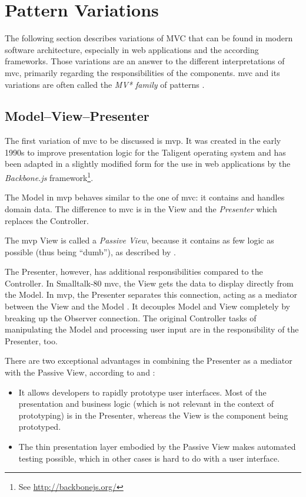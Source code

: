 \section{Pattern Variations}
The following section describes variations of MVC that can be found in modern software architecture, especially in web applications and the according frameworks. Those variations are an answer to the different interpretations of \acl{mvc}, primarily regarding the responsibilities of the components. \gls{mvc} and its variations are often called the \emph{MV* family} of patterns \cite{osmani}.

\subsection{Model--View--Presenter}
The first variation of \ac{mvc} to be discussed is \ac{mvp}. It was created in the early 1990s to improve presentation logic for the \gls{Taligent} operating system and has been adapted in a slightly modified form for the use in web applications by the \emph{Backbone.js} framework\footnote{See \url{http://backbonejs.org/}}.

The Model in \ac{mvp} behaves similar to the one of \ac{mvc}: it contains and handles domain data. The difference to \ac{mvc} is in the View and the \emph{Presenter} which replaces the Controller.

The \ac{mvp} View is called a \emph{Passive View}, because it contains as few logic as possible (thus being ``dumb''), as described by .

The Presenter, however, has additional responsibilities compared to the Controller. In Smalltalk-80 \ac{mvc}, the View gets the data to display directly from the Model. In \ac{mvp}, the Presenter separates this connection, acting as a mediator between the View and the Model \cite[p. 109]{osmani}. It decouples Model and View completely by breaking up the Observer connection. The original Controller tasks of manipulating the Model and processing user input are in the responsibility of the Presenter, too.

There are two exceptional advantages in combining the Presenter as a mediator with the Passive View, according to  and :
\begin{itemize}
	\item It allows developers to rapidly prototype user interfaces. Most of the presentation and business logic (which is not relevant in the context of prototyping) is in the Presenter, whereas the View is the component being prototyped.
	\item The thin presentation layer embodied by the Passive View makes automated testing possible, which in other cases is hard to do with a user interface.
\end{itemize}

